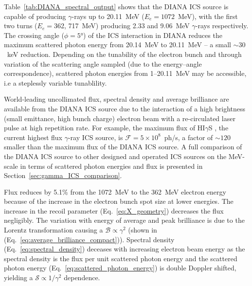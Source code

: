 \documentclass[../main.tex]{subfiles}
\begin{document}
Table~\ref{tab:DIANA_spectral_output} shows that the DIANA ICS source is capable of producing $\gamma$-rays up to 20.11~\si{\mega\electronvolt} ($E_{e}=1072$~\si{\mega\electronvolt}), with the first two turns ($E_{e} = $362, 717~\si{\mega\electronvolt}) producing 2.33 and 9.06~\si{\mega\electronvolt} $\gamma$-rays respectively. The crossing angle ($\phi=5\si{\degree}$) of the ICS interaction in DIANA reduces the maximum scattered photon energy from 20.14~\si{\mega\electronvolt} to 20.11~\si{\mega\electronvolt} -- a small $\sim 30$~\si{\kilo\electronvolt} reduction. Depending on the tunability of the electron bunch and through variation of the scattering angle sampled (due to the energy--angle correspondence), scattered photon energies from 1--20.11~\si{\mega\electronvolt} may be accessible, i.e  a steplessly variable tunablility. 

World-leading uncollimated flux, spectral density and average brilliance are available from the DIANA ICS source due to the interaction of a high brightness (small emittance, high bunch charge) electron beam with a re-circulated laser pulse at high repetition rate. For example, the maximum flux of HI$\gamma$S \cite{weller2009research}, the current highest flux $\gamma$-ray ICS source, is $\mathcal{F} =5\times 10^{8}$~ph/\si{\second}, a factor of $\sim 120$ smaller than the maximum flux of the DIANA ICS source. A full comparison of the DIANA ICS source to other designed and operated ICS sources on the \si{\mega\electronvolt}-scale in terms of scattered photon energies and flux is presented in Section~\ref{sec:gamma_ICS_comparison}. 

Flux reduces by 5.1\% from the 1072~\si{\mega\electronvolt} to the 362~\si{\mega\electronvolt} electron energy because of the increase in the electron bunch spot size at lower energies. The increase in the recoil parameter (Eq.~\ref{eq:X_geometry}) decreases the flux negligibly. The variation with energy of average and peak brilliance is
due to the Lorentz transformation  causing a $\mathcal{B}\propto \gamma^{2}$ (shown in (Eq.~\ref{eq:average_brilliance_compact})). Spectral density (Eq.~\ref{eq:spectral_density}) deceases with increasing electron beam energy as the spectral density is the flux per unit scattered photon energy and the scattered photon energy (Eq.~\ref{eq:scattered_photon_energy}) is double Doppler shifted, yielding a $\mathcal{S}\propto 1/\gamma^{2}$ dependence.  
\end{document}
